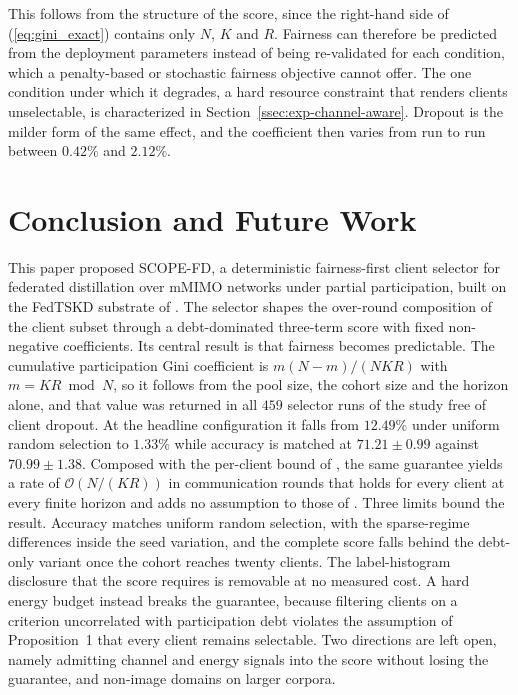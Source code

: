 \documentclass[journal]{IEEEtran}
\newcommand{\rev}[1]{#1}
\begin{document}
\rev{This follows from the structure of the score, since the right-hand side of (\ref{eq:gini_exact}) contains only $N$, $K$ and $R$. Fairness can therefore be predicted from the deployment parameters instead of being re-validated for each condition, which a penalty-based or stochastic fairness objective cannot offer. The one condition under which it degrades, a hard resource constraint that renders clients unselectable, is characterized in Section~\ref{ssec:exp-channel-aware}. Dropout is the milder form of the same effect, and the coefficient then varies from run to run between $0.42\%$ and $2.12\%$.}

\section{Conclusion and Future Work}
\label{sec:conclusion}
\rev{This paper proposed SCOPE-FD, a deterministic fairness-first client selector for federated distillation over mMIMO networks under partial participation, built on the FedTSKD substrate of \cite{mu2024fedtskd}. The selector shapes the over-round composition of the client subset through a debt-dominated three-term score with fixed non-negative coefficients. Its central result is that fairness becomes predictable. The cumulative participation Gini coefficient is $m(N-m)/(NKR)$ with $m = KR \bmod N$, so it follows from the pool size, the cohort size and the horizon alone, and that value was returned in all $459$ selector runs of the study free of client dropout. At the headline configuration it falls from $12.49\%$ under uniform random selection to $1.33\%$ while accuracy is matched at $71.21 \pm 0.99$ against $70.99 \pm 1.38$. Composed with the per-client bound of \cite{mu2024fedtskd}, the same guarantee yields a rate of $\mathcal{O}(N/(KR))$ in communication rounds that holds for every client at every finite horizon and adds no assumption to those of \cite{mu2024fedtskd}. Three limits bound the result. Accuracy matches uniform random selection, with the sparse-regime differences inside the seed variation, and the complete score falls behind the debt-only variant once the cohort reaches twenty clients. The label-histogram disclosure that the score requires is removable at no measured cost. A hard energy budget instead breaks the guarantee, because filtering clients on a criterion uncorrelated with participation debt violates the assumption of Proposition~1 that every client remains selectable. Two directions are left open, namely admitting channel and energy signals into the score without losing the guarantee, and non-image domains on larger corpora.}

\balance

\let\OLDthebibliography\thebibliography
\renewcommand\thebibliography[1]{%
  \OLDthebibliography{#1}%
  \scriptsize
  \setlength{\itemsep}{0pt plus 0.2ex}%
  \setlength{\parsep}{0pt}}

\end{document}
